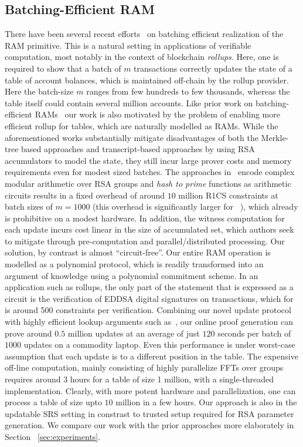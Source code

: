 \subsection{Batching-Efficient RAM}\label{subsec:batching-efficient-ram}
There have been several recent efforts~\cite{USENIX:OWWB20,CCS:CFHKKO22} on batching efficient
realization of the RAM primitive. This is a natural setting in applications of verifiable
computation, most notably in the context of blockchain {\em rollups}. Here, one is required
to show that a batch of $m$ transactions correctly updates the state of a table of account balances, which
is maintained off-chain by the rollup provider. Here the batch-size $m$ ranges from few hundreds to few
thousands, whereas the table itself could contain several million accounts.
Like prior work on batching-efficient
RAMs~\cite{USENIX:OWWB20,CCS:CFHKKO22} our work is also motivated by the problem of enabling more efficient rollup for tables, which are
naturally modelled as RAMs. While the aforementioned works substantially mitigate disadvantages of both the
Merkle-tree based approaches and transcript-based approaches by using RSA accumulators to model the state,
they still incur large prover costs and memory requirements even for modest sized batches. The approaches
in~\cite{USENIX:OWWB20,CCS:CFHKKO22} encode complex modular arithmetic over RSA groups and {\em hash
to prime} functions as arithmetic circuits results in a fixed overhead of around $10$ million R1CS constraints
at batch sizes of $m=1000$ (this overhead is significantly larger for ~\cite{USENIX:OWWB20}), which already
is prohibitive on a modest hardware. In addition, the witness computation for each update incurs cost
linear in the size of accumulated set, which authors seek to mitigate through pre-computation and
parallel/distributed processing. Our solution, by contrast is almost ``circuit-free''. Our entire
RAM operation is modelled as a polynomial protocol, which is readily transformed into an argument of
knowledge using a polynomial commitment scheme. In an application such as rollups, the only part of the statement 
that is expressed as a circuit is the verification of EDDSA digital signatures on transactions,
which for is around 500 constraints per verification.
Combining our novel update protocol with highly efficient
lookup arguments such as~\cite{CCS:CFHKKO22}, our online proof generation can prove around $0.5$ million
updates at an average of just $120$ seconds per batch of $1000$ updates on a commodity laptop. Even
this performance is under worst-case assumption that each update is to a different position in the table.
The expensive off-line computation, mainly consisting of highly parallelize FFTs over groups requires around $3$ hours for a
table of size 1 million, with a single-threaded implementation. Clearly, with more potent hardware and
parallelization, one can process a table of size upto $10$ million in a few hours. 
Our approach is also in the updatable SRS setting in constrast to trusted setup required for RSA parameter generation. We
compare our work with the prior approaches more elaborately in Section ~\ref{sec:experiments}.


